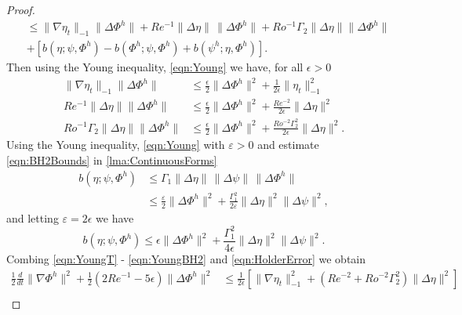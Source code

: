 \begin{proof}
\begin{equation}
\begin{split}
        &\le \|\nabla \eta_t\|_{-1} \|\Delta \Phi^h\|
        + Re^{-1}\|\Delta \eta\|\, \|\Delta \Phi^h\|
        + Ro^{-1} \Gamma_2 \|\Delta \eta\| \|\Delta \Phi^h\| \\
      & + \left[ b(\eta;\psi,\Phi^h) - b(\Phi^h;\psi,\Phi^h)
        + b(\psi^h;\eta,\Phi^h)\right].
    \end{split}
    \label{eqn:HolderError}
  \end{equation}
  Then using the Young inequality, \eqref{eqn:Young} we have, for all $\epsilon>0$
  \begin{align}
    \|\nabla \eta_t\|_{-1} \|\Delta \Phi^h\|
      &\le \frac{\epsilon}{2} \|\Delta \Phi^h\|^2
      + \frac{1}{2 \epsilon} \|\eta_t\|_{-1}^2 \label{eqn:YoungT} \\
    Re^{-1} \|\Delta \eta\| \|\Delta \Phi^h\|
      &\le \frac{\epsilon}{2} \|\Delta \Phi^h\|^2
      + \frac{Re^{-2}}{2 \epsilon} \|\Delta \eta\|^2 \label{eqn:YoungLaplace} \\
    Ro^{-1} \Gamma_2 \|\Delta \eta\| \|\Delta \Phi^h\|
      &\le \frac{\epsilon}{2} \|\Delta \Phi^h\|^2
      + \frac{Ro^{-2} \Gamma_2^2}{2 \epsilon} \|\Delta \eta\|^2. \label{eqn:YoungBeta}
  \end{align}
  Using the Young inequality, \eqref{eqn:Young} with $\varepsilon > 0$ and
  estimate \eqref{eqn:BH2Bounds} in \autoref{lma:ContinuousForms}
  \begin{align*}
    b(\eta;\psi,\Phi^h) &\le \Gamma_1 \|\Delta \eta\|\,\|\Delta \psi\|\, \|\Delta \Phi^h\| \\
    &\le \frac{\varepsilon}{2} \|\Delta \Phi^h\|^2
      + \frac{\Gamma_1^2}{2 \varepsilon} \|\Delta \eta\|^2 \|\Delta \psi\|^2,
  \end{align*}
  and letting $\varepsilon = 2 \epsilon$ we have
  \begin{equation}
    b(\eta; \psi, \Phi^h) \le \epsilon \|\Delta \Phi^h\|^2
      + \frac{\Gamma_1^2}{4 \epsilon} \|\Delta \eta\|^2 \|\Delta \psi\|^2.
      \label{eqn:YoungBH2}
  \end{equation}
  Combing \eqref{eqn:YoungT} - \eqref{eqn:YoungBH2} and \eqref{eqn:HolderError}
  we obtain
  \begin{equation}
    \begin{split}
    \frac{1}{2} \frac{d}{dt} \|\nabla \Phi^h\|^2 + \frac{1}{2}\left(2Re^{-1} -
      5 \epsilon \right)\|\Delta \Phi^h\|^2
      &\le \frac{1}{2 \epsilon}\left[\|\nabla \eta_t\|_{-1}^2
      + \left( Re^{-2} + Ro^{-2} \Gamma_2^2 \right) \|\Delta \eta\|^2\right] \\

\end{split}
\end{equation}
\end{proof}
